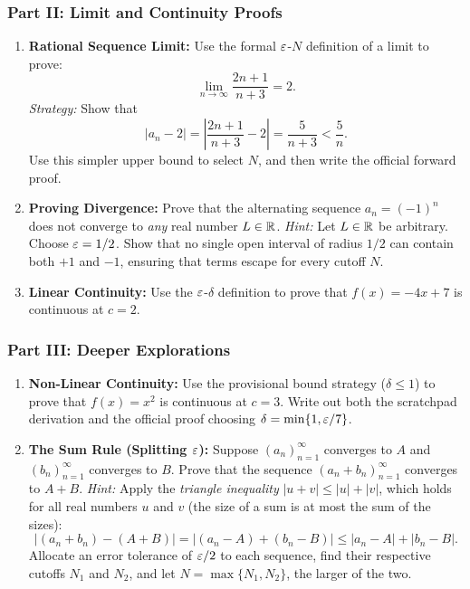\subsubsection*{Part II: Limit and Continuity Proofs}

\begin{enumerate}[resume]
\item \textbf{Rational Sequence Limit:} Use the formal $\varepsilon$-$N$ definition of a limit to prove:
\[
\lim_{n \to \infty} \frac{2n + 1}{n + 3} = 2.
\]
\emph{Strategy:} Show that
\[
|a_n - 2| = \left|\frac{2n + 1}{n + 3} - 2\right| = \frac{5}{n + 3} < \frac{5}{n}.
\]
Use this simpler upper bound to select $N$, and then write the official forward proof.
\item \textbf{Proving Divergence:} Prove that the alternating sequence $a_n = (-1)^n$ does not converge to \emph{any} real number $L \in \mathbb{R}$.
\emph{Hint:} Let $L \in \mathbb{R}$ be arbitrary. Choose $\varepsilon = 1/2$. Show that no single open interval of radius $1/2$ can contain both $+1$ and $-1$, ensuring that terms escape for every cutoff $N$.
\item \textbf{Linear Continuity:} Use the $\varepsilon$-$\delta$ definition to prove that $f(x) = -4x + 7$ is continuous at $c = 2$.
\end{enumerate}

\subsubsection*{Part III: Deeper Explorations}

\begin{enumerate}[resume]
\item \textbf{Non-Linear Continuity:} Use the provisional bound strategy ($\delta \le 1$) to prove that $f(x) = x^2$ is continuous at $c = 3$. Write out both the scratchpad derivation and the official proof choosing $\delta = \min\{1, \varepsilon/7\}$.
\item \textbf{The Sum Rule (Splitting $\varepsilon$):} Suppose $(a_n)_{n=1}^\infty$ converges to $A$ and $(b_n)_{n=1}^\infty$ converges to $B$. Prove that the sequence $(a_n + b_n)_{n=1}^\infty$ converges to $A + B$.
\emph{Hint:} Apply the \emph{triangle inequality} $|u + v| \le |u| + |v|$, which holds for all real numbers $u$ and $v$ (the size of a sum is at most the sum of the sizes):
\[
|(a_n + b_n) - (A + B)| = |(a_n - A) + (b_n - B)| \le |a_n - A| + |b_n - B|.
\]
Allocate an error tolerance of $\varepsilon/2$ to each sequence, find their respective cutoffs $N_1$ and $N_2$, and let $N = \max\{N_1, N_2\}$, the larger of the two.
\end{enumerate}

\newpage
